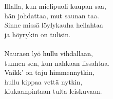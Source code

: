 
            Illalla, kun mielipuoli kuupan saa, \\
            hän johdattaa, mut saunan taa. \\
            Sinne missä löylykauha heilahtaa  \\
            ja höyrykin on tulisin. \\
\hspace{10mm} \\
            Nauraen lyö hullu vihdallaan, \\
            tunnen sen, kun nahkaan lissahtaa. \\
            Vaikk' on taju himmennytkin, \\
            hullu kippaa vettä nytkin, \\
            kiukaanpintaan tulta leiskuvaan. \\

